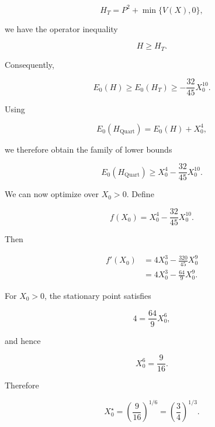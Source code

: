\documentclass{article}
\theoremstyle{definition}
\begin{document}
\begin{equation}
    H_T
    =
    P^2+\min\{V(X),0\},
\end{equation}

we have the operator inequality

\begin{equation}
    H \geq H_T.
\end{equation}

Consequently,

\begin{equation}
    E_0(H)
    \geq
    E_0(H_T)
    \geq
    -\frac{32}{45}X_0^{10}.
\end{equation}

Using

\begin{equation}
    E_0(H_{\mathrm{Quart}})
    =
    E_0(H)+X_0^4,
\end{equation}

we therefore obtain the family of lower bounds

\begin{equation}
    \boxed{
        E_0(H_{\mathrm{Quart}})
        \geq
        X_0^4-\frac{32}{45}X_0^{10}
    }.
\end{equation}

We can now optimize over $X_0>0$. Define

\begin{equation}
    f(X_0)
    =
    X_0^4-\frac{32}{45}X_0^{10}.
\end{equation}

Then

\begin{align}
    f'(X_0)
    &=
    4X_0^3
    -
    \frac{320}{45}X_0^9
    \\
    &=
    4X_0^3
    -
    \frac{64}{9}X_0^9.
\end{align}

For $X_0>0$, the stationary point satisfies

\begin{equation}
    4
    =
    \frac{64}{9}X_0^6,
\end{equation}

and hence

\begin{equation}
    X_0^6
    =
    \frac{9}{16}.
\end{equation}

Therefore

\begin{equation}
    \boxed{
        X_0^{\star}
        =
        \left(\frac{9}{16}\right)^{1/6}
        =
        \left(\frac{3}{4}\right)^{1/3}
    }.
\end{equation}
\end{document}
